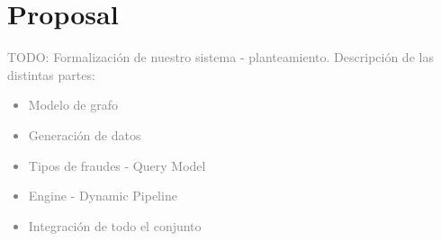 \newpage
\section{Proposal}

\textcolor{gray}{TODO: Formalización de nuestro sistema - planteamiento. Descripción de las distintas partes:
\begin{itemize}
    \item Modelo de grafo
    \item Generación de datos
    \item Tipos de fraudes - Query Model
    \item Engine - Dynamic Pipeline
    \item Integración de todo el conjunto
\end{itemize}
}




%
%
